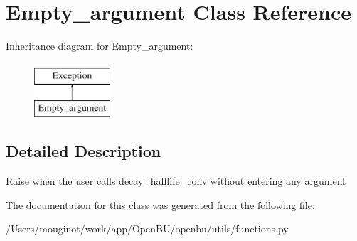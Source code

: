 \hypertarget{classopenbu_1_1utils_1_1functions_1_1_empty__argument}{}\section{Empty\+\_\+argument Class Reference}
\label{classopenbu_1_1utils_1_1functions_1_1_empty__argument}
Inheritance diagram for Empty\+\_\+argument\+:\begin{figure}[H]
\begin{center}
\leavevmode
\includegraphics[height=2.000000cm]{classopenbu_1_1utils_1_1functions_1_1_empty__argument}
\end{center}
\end{figure}


\subsection{Detailed Description}
\begin{DoxyVerb}Raise when the user calls decay_halflife_conv without entering any argument \end{DoxyVerb}
 

The documentation for this class was generated from the following file\+:\begin{DoxyCompactItemize}
\item 
/\+Users/mouginot/work/app/\+Open\+B\+U/openbu/utils/functions.\+py\end{DoxyCompactItemize}

